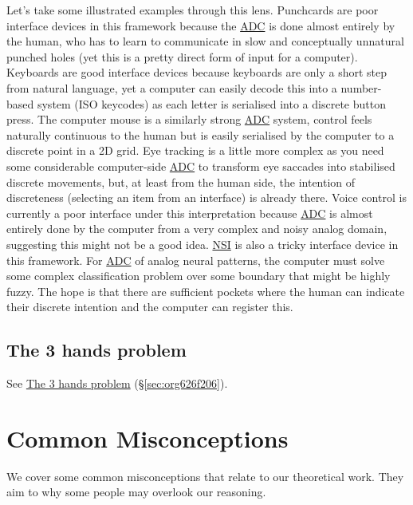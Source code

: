\documentclass[logo,bsc,singlespacing,parskip]{infthesis}
\begin{document}
Let's take some illustrated examples through this lens.
Punchcards are poor interface devices in this framework because the \hyperref[orgac94761]{ADC} is done almost entirely by the human, who has to learn to communicate in slow and conceptually unnatural punched holes (yet this is a pretty direct form of input for a computer).
Keyboards are good interface devices because keyboards are only a short step from natural language, yet a computer can easily decode this into a number-based system (ISO keycodes) as each letter is serialised into a discrete button press.
The computer mouse is a similarly strong \hyperref[orgac94761]{ADC} system, control feels naturally continuous to the human but is easily serialised by the computer to a discrete point in a 2D grid.
Eye tracking is a little more complex as you need some considerable computer-side \hyperref[orgac94761]{ADC} to transform eye saccades into stabilised discrete movements, but, at least from the human side, the intention of discreteness (selecting an item from an interface) is already there.
Voice control is currently a poor interface under this interpretation because \hyperref[orgac94761]{ADC} is almost entirely done by the computer from a very complex and noisy analog domain, suggesting this might not be a good idea.
\hyperref[org79fc546]{NSI} is also a tricky interface device in this framework.
For \hyperref[orgac94761]{ADC} of analog neural patterns, the computer must solve some complex classification problem over some boundary that might be highly fuzzy.
The hope is that there are sufficient pockets where the human can indicate their discrete intention and the computer can register this.

\section{The 3 hands problem}
\label{sec:org59194c6}

See \hyperref[sec:org626f206]{The 3 hands problem} (\S \ref{sec:org626f206}).
\chapter{Common Misconceptions}
\label{sec:org67d9006}
We cover some common misconceptions that relate to our theoretical work.
They aim to why some people may overlook our reasoning.
\end{document}
